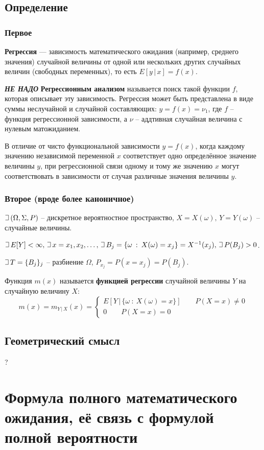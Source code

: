 \documentclass{article}
\def\letus{%
    \mathord{\setbox0=\hbox{$\exists$}%
             \hbox{\kern 0.125\wd0%
                   \vbox to \ht0{%
                      \hrule width 0.75\wd0%
                      \vfill%
                      \hrule width 0.75\wd0}%
                   \vrule height \ht0%
                   \kern 0.125\wd0}%
           }%
}
\begin{document}
\subsection{Определение}
\subsubsection{Первое}
\textbf{Регрессия} — зависимость математического ожидания (например, среднего значения) случайной величины от одной или нескольких других случайных величин (свободных переменных), то есть $E[y\,|\,x]=f(x)$.

\textbf{\textit{НЕ НАДО}} \textbf{Регрессионным анализом}
называется поиск такой функции $f$, которая описывает эту зависимость. Регрессия может быть представлена в виде суммы неслучайной и случайной составляющих: $y=f(x)=\nu_1$, где $f$ -- функция регрессионной зависимости, а $\nu$ -- аддтивная случайная величина с нулевым матожиданием.

В отличие от чисто функциональной зависимости $y=f(x)$, когда каждому значению независимой переменной $x$ соответствует одно определённое значение величины $y$, при регрессионной связи одному и тому же значению $x$ могут соответствовать в зависимости от случая различные значения величины $y$.

\subsubsection{Второе (вроде более каноничное)}
$\letus \,(\Omega,\Sigma,P)$ -- дискретное вероятностное пространство, $X=X(\omega),\,Y=Y(\omega)$ -- случайные величины.

$\letus\, E[Y]<\infty,\,\letus\, x=x_1,x_2,\dots,\,\letus\,B_j=\{\omega\::\:X(\omega)=x_j\}=X^{-1}(x_j),\,\letus\,P(B_j)>0$.

$\letus\,T=\{B_j\}_j$ -- разбиение $\Omega$, $P_{x_j}=P(x=x_j)=P(B_j)$.

Функция $m(x)$ называется \textbf{функцией регрессии} случайной величины $Y$ на случайную величину $X$:
$$ m(x)=m_{Y\,|\,X}(x)=\begin{cases}
E[Y\,|\,\{\omega\::\:X(\omega)=x\}]\quad\quad P(X=x)\neq 0\\
0\quad\quad P(X=x)=0
\end{cases}$$

\subsection{Геометрический смысл}
?
\newpage
\section{Формула полного математического ожидания, её связь с формулой полной вероятности}
\end{document}
